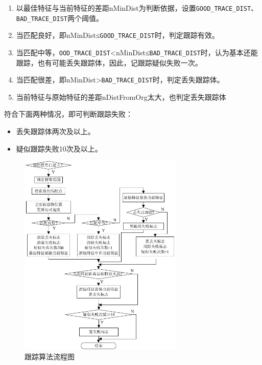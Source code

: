 \documentclass[12pt,hyperref,a4paper,UTF8]{ctexart}
\begin{document}
        \begin{enumerate}
            \item 以最佳特征与当前特征的差距nMinDist为判断依据，设置\texttt{GOOD\_TRACE\_DIST}、\texttt{BAD\_TRACE\_DIST}两个阈值。
            \item 当匹配良好，即nMinDist≤\texttt{GOOD\_TRACE\_DIST}时，判定跟踪有效。
            \item 当匹配中等，\texttt{OOD\_TRACE\_DIST}<nMinDist≤\texttt{BAD\_TRACE\_DIST}时，认为基本还能跟踪，也有可能丢失跟踪体，因此，记跟踪疑似失败一次。
            \item 当匹配很差，即nMinDist>\texttt{BAD\_TRACE\_DIST}时，判定丢失跟踪体。
            \item 当前特征与原始特征的差距nDistFromOrg太大，也判定丢失跟踪体
        \end{enumerate}


        符合下面两种情况，即可判断跟踪失败：
        \begin{itemize}
            \item 丢失跟踪体两次及以上。
            \item 疑似跟踪失败10次及以上。
        \end{itemize}

        \begin{figure}[H]
            \centering
            \includegraphics[width=0.7\textwidth]{./figures/fig/image11.png}
            \caption{跟踪算法流程图}
            \label{fig:eye_nose_tracking}
        \end{figure}
\end{document}
